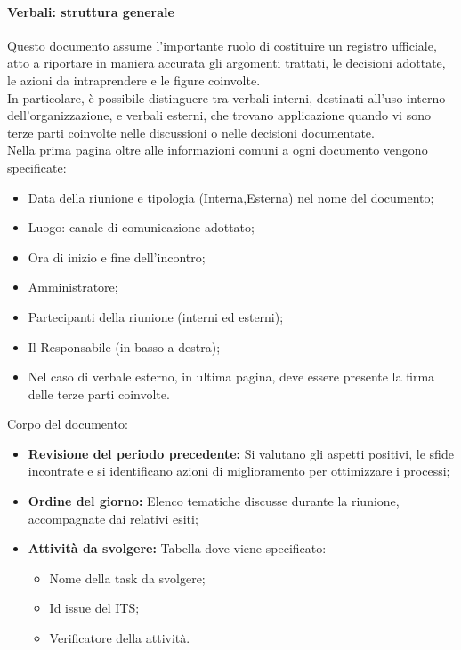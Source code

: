 \documentclass{article}
\begin{document}
\begin{enumerate}
\paragraph{Verbali: struttura generale}
Questo documento assume l'importante ruolo di costituire un registro ufficiale, atto a riportare in maniera accurata gli argomenti trattati, le decisioni adottate, le azioni da intraprendere e le figure coinvolte.\\
In particolare, è possibile distinguere tra verbali interni, destinati all'uso interno dell'organizzazione, e verbali esterni, che trovano applicazione quando vi sono terze parti coinvolte nelle discussioni o nelle decisioni documentate.\\
Nella prima pagina oltre alle informazioni comuni a ogni documento vengono specificate:
\begin{itemize}
    \item Data della riunione e tipologia (Interna,Esterna) nel nome del documento;
    \item Luogo: canale di comunicazione adottato;
    \item Ora di inizio e fine dell'incontro;
    \item Amministratore;
    \item Partecipanti della riunione (interni ed esterni);
    \item Il Responsabile (in basso a destra);
    \item Nel caso di verbale esterno, in ultima pagina, deve essere presente la firma delle terze parti coinvolte.
\end{itemize}
Corpo del documento:
\begin{itemize}
    \item  \textbf{Revisione del periodo precedente:} Si valutano gli aspetti positivi, le sfide incontrate e si identificano azioni di miglioramento per ottimizzare i processi;
    \item  \textbf{Ordine del giorno:} Elenco tematiche discusse durante la riunione, accompagnate dai relativi esiti;
    \item  \textbf{Attività da svolgere:} Tabella dove viene specificato:
          \begin{itemize}
              \item Nome della task da svolgere;
              \item Id issue del ITS;
              \item Verificatore della attività.
          \end{itemize}
\end{itemize}



\end{enumerate}
\end{document}
